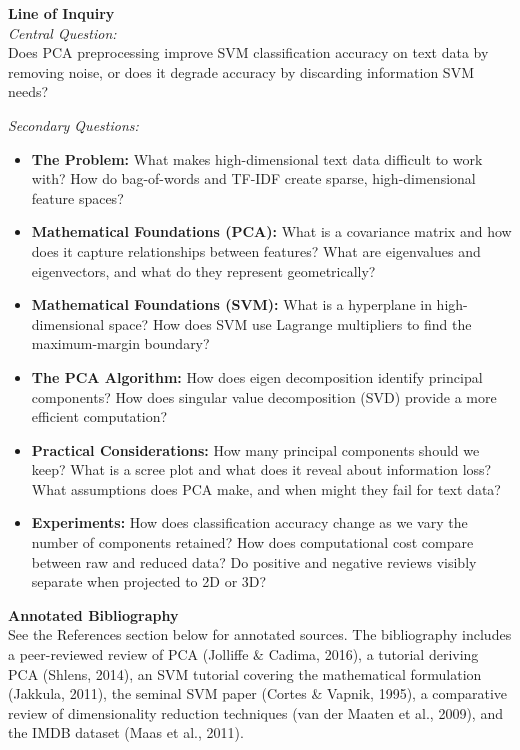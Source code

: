 \documentclass[runningheads]{llncs}
\begin{document}
\medskip

\noindent\textbf{Line of Inquiry}\\

\medskip 
\noindent 
\textit{Central Question:} \\ \hfill \break
Does PCA preprocessing improve SVM classification accuracy on text data by removing noise, or does it degrade accuracy by discarding information SVM needs?

\medskip 
\noindent 
\textit{Secondary Questions:} 
\begin{itemize}
    \item \textbf{The Problem:} What makes high-dimensional text data difficult to work with? How do bag-of-words and TF-IDF create sparse, high-dimensional feature spaces?
    \item \textbf{Mathematical Foundations (PCA):} What is a covariance matrix and how does it capture relationships between features? What are eigenvalues and eigenvectors, and what do they represent geometrically?
    \item \textbf{Mathematical Foundations (SVM):} What is a hyperplane in high-dimensional space? How does SVM use Lagrange multipliers to find the maximum-margin boundary?
    \item \textbf{The PCA Algorithm:} How does eigen decomposition identify principal components? How does singular value decomposition (SVD) provide a more efficient computation?
    \item \textbf{Practical Considerations:} How many principal components should we keep? What is a scree plot and what does it reveal about information loss? What assumptions does PCA make, and when might they fail for text data?
    \item \textbf{Experiments:} How does classification accuracy change as we vary the number of components retained? How does computational cost compare between raw and reduced data? Do positive and negative reviews visibly separate when projected to 2D or 3D?
\end{itemize}

\noindent\textbf{Annotated Bibliography}\\

\medskip
\noindent 
See the References section below for annotated sources. The bibliography includes a peer-reviewed review of PCA (Jolliffe \& Cadima, 2016), a tutorial deriving PCA (Shlens, 2014), an SVM tutorial covering the mathematical formulation (Jakkula, 2011), the seminal SVM paper (Cortes \& Vapnik, 1995), a comparative review of dimensionality reduction techniques (van der Maaten et al., 2009), and the IMDB dataset (Maas et al., 2011).

\medskip
\newpage
\nocite{*}


\end{document}
